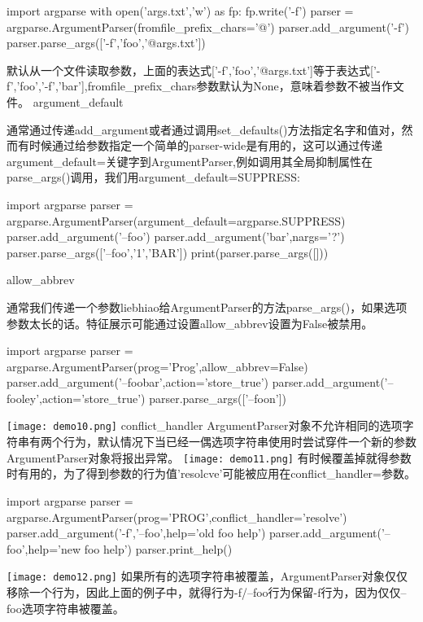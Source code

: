 \begin{python}
import argparse
with open('args.txt','w') as fp:
    fp.write('-f\nbar')
parser = argparse.ArgumentParser(fromfile_prefix_chars='@')
parser.add_argument('-f')
parser.parse_args(['-f','foo','@args.txt'])
\end{python}
默认从一个文件读取参数，上面的表达式['-f','foo','@args.txt']等于表达式['-f','foo','-f','bar'],fromfile\_prefix\_chars参数默认为None，意味着参数不被当作文件。
argument\_default\par
通常通过传递add\_argument或者通过调用set\_defaults()方法指定名字和值对，然而有时候通过给参数指定一个简单的parser-wide是有用的，这可以通过传递argument\_default=关键字到ArgumentParser,例如调用其全局抑制属性在parse\_args()调用，我们用argument\_default=SUPPRESS:
\begin{python}
import argparse
parser = argparse.ArgumentParser(argument_default=argparse.SUPPRESS)
parser.add_argument('--foo')
parser.add_argument('bar',nargs='?')
parser.parse_args(['--foo','1','BAR'])
print(parser.parse_args([]))
\end{python}
allow\_abbrev\par
通常我们传递一个参数liebhiao给ArgumentParser的方法parse\_args()，如果选项参数太长的话。特征展示可能通过设置allow\_abbrev设置为False被禁用。
\begin{python}
import argparse
parser = argparse.ArgumentParser(prog='Prog',allow_abbrev=False)
parser.add_argument('--foobar',action='store_true')
parser.add_argument('--fooley',action='store_true')
parser.parse_args(['--foon'])
\end{python}
\texttt{[image: demo10.png]}\newline
conflict\_handler\newline
ArgumentParser对象不允许相同的选项字符串有两个行为，默认情况下当已经一偶选项字符串使用时尝试穿件一个新的参数ArgumentParser对象将报出异常。
\texttt{[image: demo11.png]}
有时候覆盖掉就得参数时有用的，为了得到参数的行为值'resolcve'可能被应用在conflict\_handler=参数。
\begin{python}
import argparse
parser = argparse.ArgumentParser(prog='PROG',conflict_handler='resolve')
parser.add_argument('-f','--foo',help='old foo help')
parser.add_argument('--foo',help='new foo help')
parser.print_help()
\end{python}
\texttt{[image: demo12.png]}\newline
如果所有的选项字符串被覆盖，ArgumentParser对象仅仅移除一个行为，因此上面的例子中，就得行为-f/--foo行为保留-f行为，因为仅仅--foo选项字符串被覆盖。
